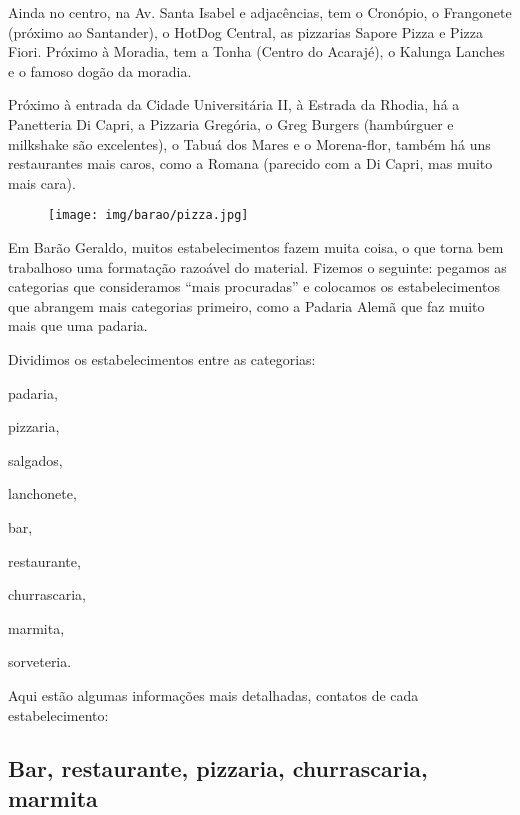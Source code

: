 Ainda no centro, na Av. Santa Isabel e adjacências, tem o Cronópio, o
Frangonete (próximo ao Santander), o HotDog Central, as pizzarias Sapore Pizza
e Pizza Fiori. Próximo à Moradia, tem a Tonha (Centro do Acarajé), o Kalunga
Lanches e o famoso dogão da moradia.

Próximo à entrada da Cidade Universitária II, à Estrada da Rhodia, há a
Panetteria Di Capri, a Pizzaria Gregória, o Greg Burgers (hambúrguer e
milkshake são excelentes), o Tabuá dos Mares e o Morena-flor, também há uns
restaurantes mais caros, como a Romana (parecido com a Di Capri, mas muito mais
cara).\\

\begin{figure}[h!]
  \centering
  \texttt{[image: img/barao/pizza.jpg]}
\end{figure}

Em Barão Geraldo, muitos estabelecimentos fazem muita coisa, o que torna bem
trabalhoso uma formatação razoável do material. Fizemos o seguinte: pegamos as
categorias que consideramos ``mais procuradas'' e colocamos os estabelecimentos
que abrangem mais categorias primeiro, como a Padaria Alemã que faz muito mais
que uma padaria.

Dividimos os estabelecimentos entre as categorias:

\begin{compactitemize}
\begin{multicols}{2}
\item padaria,
\item pizzaria,
\item salgados,
\item lanchonete,
\item bar,
\item restaurante,
\item churrascaria,
\item marmita,
\item sorveteria.
\end{multicols}
\end{compactitemize}

Aqui estão algumas informações mais detalhadas, contatos de cada
estabelecimento:

\subsection{Bar, restaurante, pizzaria, churrascaria, marmita}

